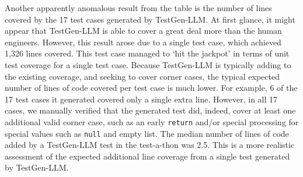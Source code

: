 \documentclass[sigconf,screen]{acmart}
\begin{document}
Another apparently anomalous result from the table is the number of lines covered by the 17 test cases generated by TestGen-LLM.
At first glance, it might appear that TestGen-LLM is able to cover a great deal more than the human engineers. 
However, this result arose due to a single test case, which achieved 1,326 lines covered. 
This test case managed to `hit the jackpot' in terms of unit test coverage for a single test case.
Because TestGen-LLM is typically adding to the existing coverage, 
and seeking to cover corner cases, the typical expected number of lines of code covered per test case is much lower. 
For example, 6 of the 17 test cases it generated covered only a single extra line. 
However, in all 17  cases, we  manually verified that the generated test did, indeed, cover at least one additional valid  corner case, 
such as an early {\tt return} and/or special processing for special values such as {\tt null} and empty list.
The median number of lines of code added by a TestGen-LLM test in the test-a-thon was 2.5.
This is a more realistic assessment of the expected additional line coverage from a single test generated by TestGen-LLM.


\end{document}
